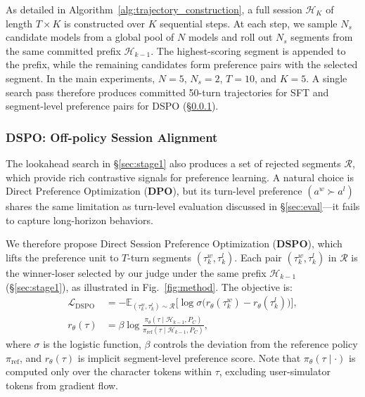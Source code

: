 As detailed in Algorithm~\ref{alg:trajectory_construction}, a full session $\mathcal{H}_{K}$ of length $T\times K$ is constructed over $K$ sequential steps. At each step, we sample $N_s$ candidate models from a global pool of $N$ models and roll out $N_s$ segments from the same committed prefix $\mathcal{H}_{k-1}$. The highest-scoring segment is appended to the prefix, while the remaining candidates form preference pairs with the selected segment. In the main experiments, $N=5$, $N_s=2$, $T=10$, and $K=5$. A single search pass therefore produces committed 50-turn trajectories for SFT and segment-level preference pairs for DSPO (§\ref{sec:stage2}).




\subsubsection{DSPO: Off-policy Session Alignment}
\label{sec:stage2}

The lookahead search in §\ref{sec:stage1} also produces a set of rejected segments $\mathcal{R}$, which provide rich contrastive signals for preference learning. A natural choice is Direct Preference Optimization (\textbf{DPO}), but its turn-level preference $(a^w \succ a^l)$ shares the same limitation as turn-level evaluation discussed in §\ref{sec:eval}—it fails to capture long-horizon behaviors.

We therefore propose Direct Session Preference Optimization (\textbf{DSPO}), which lifts the preference unit to  $T$-turn segments $(\tau^w_{k}, \tau^l_{k})$. Each pair $(\tau^w_{k}, \tau^l_{k})$ in $\mathcal{R}$ is the winner-loser selected by our judge under the same prefix $ \mathcal{H}_{k-1}$ (§\ref{sec:stage1}), as illustrated in Fig.~\ref{fig:method}. The objective is:
\begin{align}
\mathcal{L}_{\text{DSPO}} &= -\mathbb{E}_{(\tau^w_k, \tau^l_k) \sim \mathcal{R}}\bigl[\log \sigma\bigl(r_\theta(\tau^w_{k}) - r_\theta(\tau^l_{k})\bigr)\bigr], \nonumber \\
r_\theta(\tau) &= \beta \log \frac{\pi_\theta(\tau \mid \mathcal{H}_{k-1}, P_C)}{\pi_{\text{ref}}(\tau \mid \mathcal{H}_{k-1}, P_C)},
\label{eq:dspo}
\end{align}
where $\sigma$ is the logistic function, $\beta$ controls the deviation from the reference policy $\pi_{\text{ref}}$, and $r_\theta(\tau)$ is implicit segment-level preference score. Note that $\pi_\theta(\tau \mid \cdot)$ is computed only over the character tokens within $\tau$, excluding user-simulator tokens from gradient flow.


